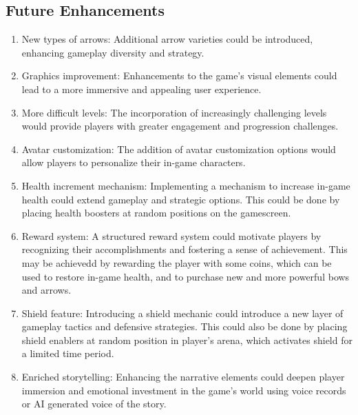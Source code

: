 \subsection{Future Enhancements}
\begin{enumerate}
	\item New types of arrows:
	 Additional arrow varieties could be introduced, enhancing gameplay diversity and strategy. 
	\item Graphics improvement:
	 Enhancements to the game's visual elements could lead to a more immersive and appealing user experience.
	\item More difficult levels:
	 The incorporation of increasingly challenging levels would provide players with greater engagement and progression challenges.
	\item Avatar customization: 
	The addition of avatar customization options would allow players to personalize their in-game characters.
	\item  Health increment mechanism:
	 Implementing a mechanism to increase in-game health could extend gameplay and strategic options. This could be done by placing health boosters at random positions on the gamescreen.
	\item Reward system:
	 A structured reward system could motivate players by recognizing their accomplishments and fostering a sense of achievement. This may be achievedd by rewarding the player with some coins, which can be used to restore in-game health, and to purchase new and more powerful bows and arrows.
	\item Shield feature:
	 Introducing a shield mechanic could introduce a new layer of gameplay tactics and defensive strategies. This could also be done by placing shield enablers at random position in player's arena, which activates shield for a limited time period.
	\item  Enriched storytelling:
	 Enhancing the narrative elements could deepen player immersion and emotional investment in the game's world using voice records or AI generated voice of the story.
\end{enumerate}


\newpage